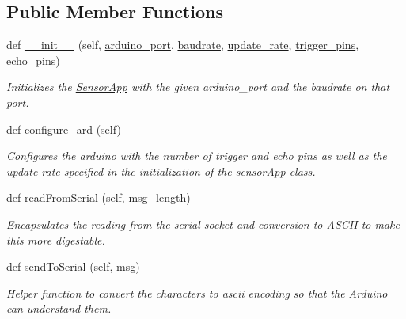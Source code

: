 \subsection*{Public Member Functions}
\begin{DoxyCompactItemize}
\item 
def \mbox{\hyperlink{class_sensor_app_1_1_sensor_app_ad925f61b0da07144eda6b3d313087d2e}{\+\_\+\+\_\+init\+\_\+\+\_\+}} (self, \mbox{\hyperlink{class_sensor_app_1_1_sensor_app_a888dda7b7c27cafa37ed670114bf1c9b}{arduino\+\_\+port}}, \mbox{\hyperlink{class_sensor_app_1_1_sensor_app_a63cf06625f46bb3ac62bead94d06f2b4}{baudrate}}, \mbox{\hyperlink{class_sensor_app_1_1_sensor_app_ad6dfe39d8eb808d881f5a4f76f1b38ac}{update\+\_\+rate}}, \mbox{\hyperlink{class_sensor_app_1_1_sensor_app_a657c2112bb07280d3249eb1f1899affd}{trigger\+\_\+pins}}, \mbox{\hyperlink{class_sensor_app_1_1_sensor_app_a1e393f1f58d859a71a34c53849929e7c}{echo\+\_\+pins}})
\begin{DoxyCompactList}\small\item\em Initializes the \mbox{\hyperlink{class_sensor_app_1_1_sensor_app}{Sensor\+App}} with the given arduino\+\_\+port and the baudrate on that port. \end{DoxyCompactList}\item 
def \mbox{\hyperlink{class_sensor_app_1_1_sensor_app_a59839f70657056c516b4740b610755fa}{configure\+\_\+ard}} (self)
\begin{DoxyCompactList}\small\item\em Configures the arduino with the number of trigger and echo pins as well as the update rate specified in the initialization of the sensor\+App class. \end{DoxyCompactList}\item 
def \mbox{\hyperlink{class_sensor_app_1_1_sensor_app_a6558c7ef5bd20ba3d71bb84b24431853}{read\+From\+Serial}} (self, msg\+\_\+length)
\begin{DoxyCompactList}\small\item\em Encapsulates the reading from the serial socket and conversion to A\+S\+C\+II to make this more digestable. \end{DoxyCompactList}\item 
def \mbox{\hyperlink{class_sensor_app_1_1_sensor_app_a77bcd8b2f4f3bf1c55e8c7fa105edf46}{send\+To\+Serial}} (self, msg)
\begin{DoxyCompactList}\small\item\em Helper function to convert the characters to ascii encoding so that the Arduino can understand them. \end{DoxyCompactList}\item 

\end{DoxyCompactItemize}

